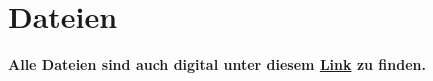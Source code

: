 \chapter{Dateien} \label{sec:dateien}

\textbf{
Alle Dateien sind auch digital unter diesem \href{https://github.com/BenediktMehl/master-thesis/tree/main/anhang}{Link} \cite{anhaenge_github} zu finden.
}




